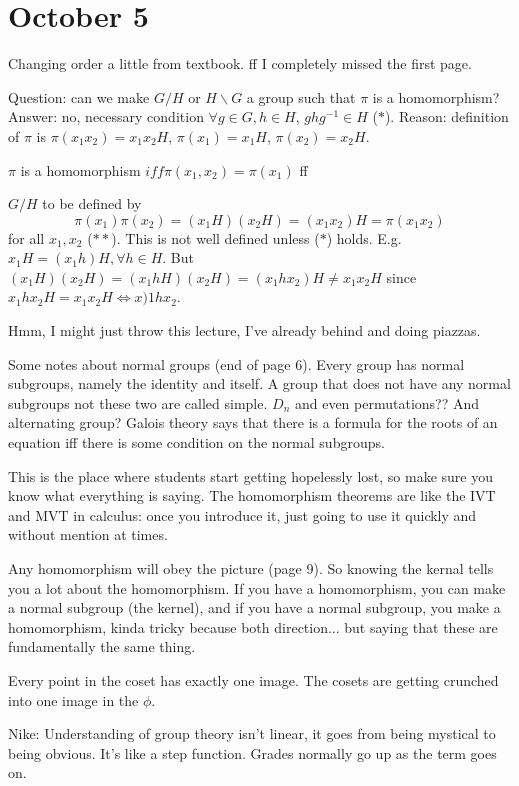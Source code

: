 \documentclass{article}
\theoremstyle{plain}
\theoremstyle{remark}
\begin{document}
\section{October 5}
Changing order a little from textbook.
ff I completely missed the first page.

Question: can we make $G / H$ or $H \backslash G$ a group
such that $\pi$ is a homomorphism?
Answer: no, necessary condition $\forall g \in G, h \in H$, $ghg^{-1} \in H$ ($*$).
Reason: definition of $\pi$ is $\pi(x_1x_2) = x_1x_2H$, $\pi(x_1)=x_1H$, $\pi(x_2) = x_2H$.

$\pi$ is a homomorphism $iff \pi(x_1,x_2) = \pi(x_1)$ ff

$G/H$ to be defined by
\[
	\pi(x_1)\pi(x_2) = (x_1H)(x_2H) = (x_1x_2)H = \pi(x_1x_2)
\]
for all $x_1,x_2$ ($**$).
This is not well defined unless ($*$) holds.
E.g. $x_1 H = (x_1h)H, \forall h \in H$.
But $(x_1 H)(x_2 H) = (x_1hH) (x_2H) = (x_1hx_2)H \neq x_1x_2H$
since $x_1hx_2H = x_1 x_2 H \iff x)1 h x_2$.

Hmm, I might just throw this lecture, I've already behind and doing piazzas.

Some notes about normal groups (end of page 6).
Every group has normal subgroups, namely the identity and itself.
A group that does not have any normal subgroups not these two are called simple.
$D_n$ and even permutations?? And alternating group?
Galois theory says that there is a formula for the roots of an equation
iff there is some condition on the normal subgroups.

This is the place where students start getting hopelessly lost,
so make sure you know what everything is saying.
The homomorphism theorems are like the IVT and MVT in calculus:
once you introduce it, just going to use it quickly and without mention at times.

Any homomorphism will obey the picture (page 9).
So knowing the kernal tells you a lot about the homomorphism.
If you have a homomorphism, you can make a normal subgroup (the kernel),
and if you have a normal subgroup, you make a homomorphism,
kinda tricky because both direction... but saying that these are fundamentally the same thing.

Every point in the coset has exactly one image.
The cosets are getting crunched into one image in the $\phi$.

Nike: Understanding of group theory isn't linear,
it goes from being mystical to being obvious.
It's like a step function.
Grades normally go up as the term goes on.
\end{document}
